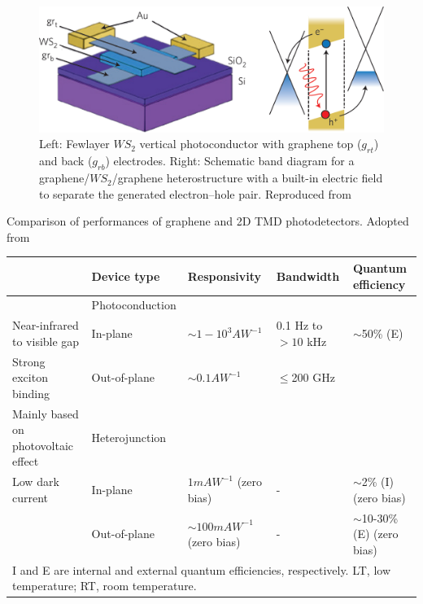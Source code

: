 \begin{figure}[!h]
	\begin{center}
		\includegraphics[scale=0.25]{PhotoconductorDiagram.png}
		\caption{Left: Fewlayer $WS_2$ vertical photoconductor with graphene top ($g_{rt}$) and back ($g_{rb}$) electrodes. Right: Schematic band diagram for a graphene/$WS_2$/graphene heterostructure with a built-in electric field to separate the generated electron–hole pair. Reproduced from \cite{Mak2016}}
		\label{fig:PhotoconductorDiagram}
	\end{center}
\end{figure}

\newpage
\begin{table}[!ht]
	\label{tab:GrapheneTMDCPhotodectorsComparison}
	\caption{Comparison of performances of graphene and 2D TMD photodetectors. Adopted from \cite{Mak2016}}
\end{table}

\begin{tiny}
	\begin{center}
		\begin{tabular}{l|llll}

									& Device type		& Responsivity				& Bandwidth			& Quantum efficiency	\\\hline
									& Photoconduction	& 							&					&						\\	
Near-infrared to visible gap		& In-plane			& $\sim 1-10^3 AW^{-1}$		& 0.1 Hz to $>10$ kHz & $\sim$50\% (E) 			\\
Strong exciton binding				& Out-of-plane		& $\sim 0.1 AW^{-1}$		& $\leq$200 GHz 	& 						\\
Mainly based on photovoltaic effect & Heterojunction 	& 							& 					&						\\
Low dark current					& In-plane			& $1 mAW^{-1}$ (zero bias)	& - 				& $\sim$2\% (I) (zero bias) 	\\
									& Out-of-plane		& $\sim 100 mAW^{-1}$ (zero bias)& -			& $\sim$10-30\% (E) (zero bias) \\\hline
\multicolumn{5}{l}{I and E are internal and external quantum efficiencies, respectively. LT, low temperature; RT, room temperature.}

		\end{tabular}
	\end{center}
\end{tiny}

